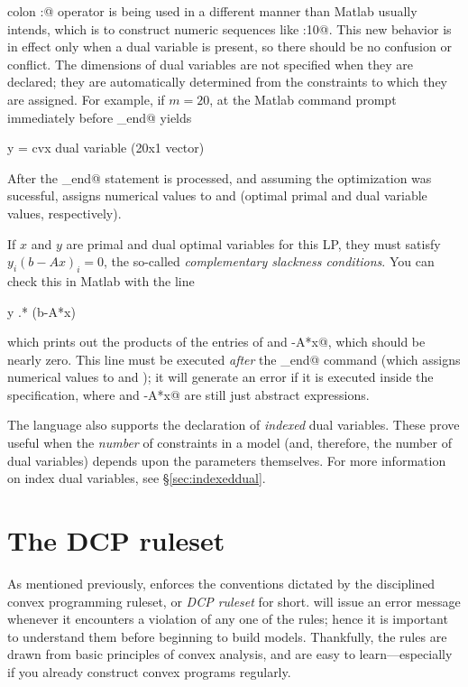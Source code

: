 \documentclass[12pt]{article}
\begin{document}
colon \verb@:@ operator is being used in a different manner than 
Matlab usually intends, which is to construct numeric sequences
like :10@. This new behavior is in effect only
when a dual variable is present, so there should be no confusion 
or conflict.
The dimensions of dual variables are not specified 
when they are declared; they are
automatically determined from the constraints to which they 
are assigned.
For example, if $m=20$, \verb@y@ at the Matlab command prompt 
immediately before \verb@cvx_end@ yields
\begin{code}
y =
    cvx dual variable (20x1 vector)
\end{code}
After the \verb@cvx_end@ statement is processed, and assuming the
optimization was sucessful, \cvx assigns numerical values to
\verb@x@ and \verb@y@ (optimal primal and dual variable values,
respectively).

If $x$ and $y$ are primal and dual optimal variables for this LP,
they must satisfy $y_i(b-Ax)_i=0$, the so-called
\emph{complementary slackness conditions}.
You can check this in Matlab with the line
\begin{code}
	y .* (b-A*x)
\end{code}
which prints out the products of the entries of \verb@y@ and 
\verb@b-A*x@, which should be nearly zero.
This line must be executed \emph{after} the \verb@cvx_end@ command
(which assigns numerical values to \verb@x@ and \verb@y@); it will
generate an error if it is executed inside the \cvx specification,
where \verb@y@ and \verb@b-A*x@ are still just abstract expressions.

The \cvx language also supports the declaration of \emph{indexed} dual
variables. These prove useful when the \emph{number} of constraints in
a model (and, therefore, the number of dual variables) depends upon the
parameters themselves. For more information on index dual variables,
see \S\ref{sec:indexeddual}.

\section{The DCP ruleset}
\label{sec:rules}

As mentioned previously, \cvx enforces the conventions dictated by the
disciplined convex programming ruleset, or \emph{DCP ruleset} for short.
\cvx will issue an error message whenever it encounters a violation of any
one of the rules; hence it is important to understand
them before beginning to build models. Thankfully, the rules are drawn
from basic principles of convex analysis, and are easy to learn---especially
if you already construct convex programs regularly.
\end{document}
